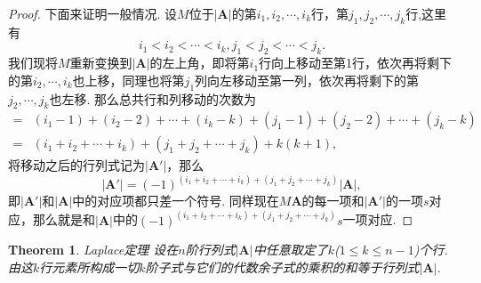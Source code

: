 \documentclass{article}
\newtheorem{theorem}{Theorem}[section]
\newcommand{\mbf}[1]{\bm{#1}}
\begin{document}
\begin{proof}
下面来证明一般情况. 设$M$位于$|\mbf{A}|$的第$i_1,i_2,\cdots,i_k$行，第$j_1,j_2,\cdots,j_k$行,这里有
$$
i_1 < i_2 < \cdots < i_k,j_1 < j_2 < \cdots < j_k.
$$
我们现将$M$重新变换到$|\mbf{A}|$的左上角，即将第$i_1$行向上移动至第1行，依次再将剩下的第$i_2,\cdots,i_k$也上移，同理也将第$j_1$列向左移动至第一列，依次再将剩下的第$j_2,\cdots,j_k$也左移. 那么总共行和列移动的次数为
$$
\begin{array}{ll}
=&(i_1-1)+(i_2-2)+\cdots+(i_k-k)+(j_1-1)+(j_2-2)+\cdots+(j_k-k)
\\
=&(i_1 + i_2 + \cdots + i_k) + (j_1 + j_2 + \cdots + j_k) + k(k+1),
\end{array}
$$
将移动之后的行列式记为$|\mbf{A}'|$，那么
$$
|\mbf{A}'| = (-1)^{(i_1 + i_2 + \cdots + i_k) + (j_1 + j_2 + \cdots + j_k)}|\mathbf{A}|,
$$
即$|\mathbf{A}'|$和$|\mathbf{A}|$中的对应项都只差一个符号. 同样现在$M\mathbf{A}$的每一项和$|\mathbf{A}'|$的一项$s$对应，那么就是和$|\mathbf{A}|$中的$(-1)^{(i_1 + i_2 + \cdots + i_k) + (j_1 + j_2 + \cdots + j_k)}s$一项对应.
\end{proof}

\begin{theorem}
\rm {\color{red} Laplace定理} 设在$n$阶行列式$|\mbf{A}|$中任意取定了$k$($1\leq k \leq n-1$)个行. 由这$k$行元素所构成一切$k$阶子式与它们的代数余子式的乘积的和等于行列式$|\mbf{A}|$.
\end{theorem}
\end{document}
